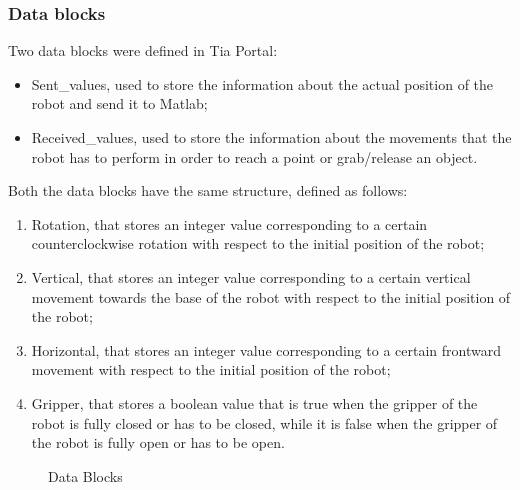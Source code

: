 \subsubsection{Data blocks}
Two data blocks were defined in Tia Portal:
\begin{itemize}
    \item Sent\_values, used to store the information about the actual position of the robot and send it to Matlab;
    \item Received\_values, used to store the information about the movements that the robot has to perform in order to reach a point or grab/release an object.
\end{itemize}
Both the data blocks have the same structure, defined as follows:
\begin{enumerate}
    \item Rotation, that stores an integer value corresponding to a certain counterclockwise rotation with respect to the initial position of the robot;
    \item Vertical, that stores an integer value corresponding to a certain vertical movement towards the base of the robot with respect to the initial position of the robot;
    \item Horizontal, that stores an integer value corresponding to a certain frontward movement with respect to the initial position of the robot;
    \item Gripper, that stores a boolean value that is true when the gripper of the robot is fully closed or has to be closed, while it is false when the gripper of the robot is fully open or has to be open. 
\end{enumerate}

\begin{figure}[!h]
\centering
{}
\qquad
{}
\caption{Data Blocks}
\label{fig:data_blocks}
\end{figure}

